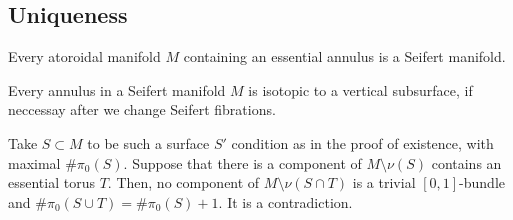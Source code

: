 \documentclass{../../../small}
\begin{document}
\subsection{Uniqueness}

\begin{lem}
Every atoroidal manifold $M$ containing an essential annulus is a Seifert manifold.
\end{lem}
\begin{lem}
Every annulus in a Seifert manifold $M$ is isotopic to a vertical subsurface, if neccessay after we change Seifert fibrations.
\end{lem}
\begin{pf}
Take $S\subset M$ to be such a surface $S'$ condition as in the proof of existence, with maximal $\#\pi_0(S)$.
Suppose that there is a component of $M\setminus\nu(S)$ contains an essential torus $T$.
Then, no component of $M\setminus\nu(S\cap T)$ is a trivial $[0,1]$-bundle and $\#\pi_0(S\cup T)=\#\pi_0(S)+1$.
It is a contradiction.
\end{pf}
\end{document}
